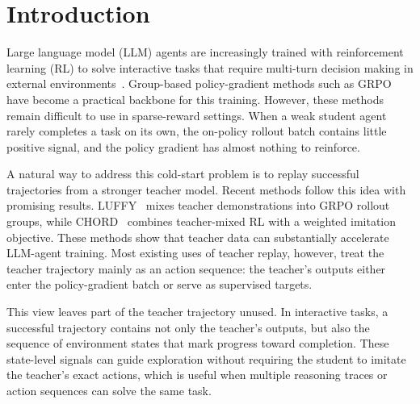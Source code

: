 %

\section{Introduction}
\label{sec:intro}

Large language model (LLM) agents are increasingly trained with reinforcement learning (RL) to solve interactive tasks that require multi-turn decision making in external environments~\citep{shridhar2020alfworld,yao2022webshop,yao2022react}. Group-based policy-gradient methods such as GRPO~\citep{shao2024deepseekmath} have become a practical backbone for this training. However, these methods remain difficult to use in sparse-reward settings. When a weak student agent rarely completes a task on its own, the on-policy rollout batch contains little positive signal, and the policy gradient has almost nothing to reinforce.

A natural way to address this cold-start problem is to replay successful trajectories from a stronger teacher model. Recent methods follow this idea with promising results. LUFFY~\citep{yan2025luffy} mixes teacher demonstrations into GRPO rollout groups, while CHORD~\citep{zhang2025chord} combines teacher-mixed RL with a weighted imitation objective. These methods show that teacher data can substantially accelerate LLM-agent training.  
Most existing uses of teacher replay, however, treat the teacher trajectory mainly as an action sequence: the teacher’s outputs either enter the policy-gradient batch or serve as supervised targets.

 This view leaves part of the teacher trajectory unused. In interactive tasks, a successful trajectory contains not only the teacher’s outputs, but also the sequence of environment states that mark progress toward completion. These state-level signals can guide exploration without requiring the student to imitate the teacher’s exact actions, which is useful when multiple reasoning traces or action sequences can solve the same task.

